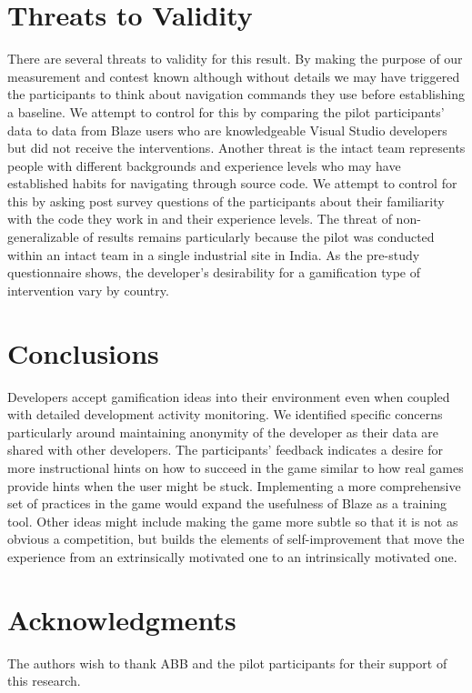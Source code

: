 \documentclass{sig-alternate}
\begin{document}
\section{Threats to Validity}
There are several threats to validity for this result.  By making the purpose of our measurement and contest known although without details we may have triggered the participants to think about navigation commands they use before establishing a baseline.  We attempt to control for this by comparing the pilot participants' data to data from Blaze users who are knowledgeable Visual Studio developers but did not receive the interventions.  Another threat is the intact team represents people with different backgrounds and experience levels who may have established habits for navigating through source code.  We attempt to control for this by asking post survey questions of the participants about their familiarity with the code they work in and their experience levels.  The threat of non- generalizable of results remains particularly because the pilot was conducted within an intact team in a single industrial site in India. As the pre-study questionnaire shows, the developer's desirability for a gamification type of intervention vary by country.

\section{Conclusions}
Developers accept gamification ideas into their environment even when coupled with detailed development activity monitoring.   We identified specific concerns particularly around maintaining anonymity of the developer as their data are shared with other developers.  The participants' feedback indicates a desire for more instructional hints on how to succeed in the game similar to how real games provide hints when the user might be stuck.  Implementing a more comprehensive set of practices in the game would expand the usefulness of Blaze as a training tool.  Other ideas might include making the game more subtle so that it is not as obvious a competition, but builds the elements of self-improvement that move the experience from an extrinsically motivated one to an intrinsically motivated one.  

\section{Acknowledgments}
The authors wish to thank ABB and the pilot participants for their support of this research.

%

\balance
 
%
%
\end{document}
